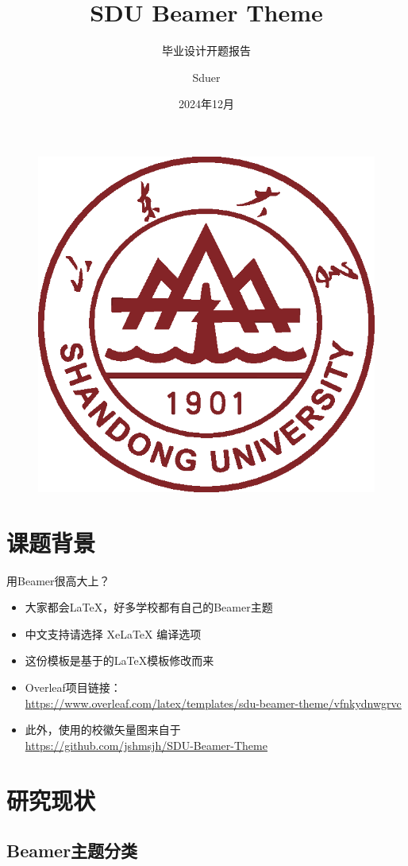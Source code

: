\documentclass[aspectratio=169]{beamer}
\author{Sduer}
\title{SDU Beamer Theme}
\subtitle{毕业设计开题报告}
\institute{山东大学xxx学院}
\date{2024年12月}
\begin{document}
\begin{frame}
    \titlepage
    \begin{figure}[htpb]
        \begin{center}
            \includegraphics[width=0.1\linewidth]{img/Example/SDU.eps}
        \end{center}
    \end{figure}
\end{frame}

\begin{frame}
    \tableofcontents[sectionstyle=show,subsectionstyle=show/shaded/hide,subsubsectionstyle=show/shaded/hide]
\end{frame}

\section{课题背景}

\begin{frame}{用Beamer很高大上？}
    \begin{itemize}[<+-| alert@+>] %
        \item 大家都会\LaTeX{}，好多学校都有自己的Beamer主题
        \item 中文支持请选择 Xe\LaTeX{} 编译选项
        \item 这份模板是基于\cite{origin}的\LaTeX{}模板修改而来
        \item Overleaf项目链接：\\
        \tiny\url{https://www.overleaf.com/latex/templates/sdu-beamer-theme/vfnkydnwgrvc}
        \item 此外，使用的校徽矢量图来自于\\\url{https://github.com/jshmsjh/SDU-Beamer-Theme}
    \end{itemize}
\end{frame}

\section{研究现状}

\subsection{Beamer主题分类}
\end{document}
